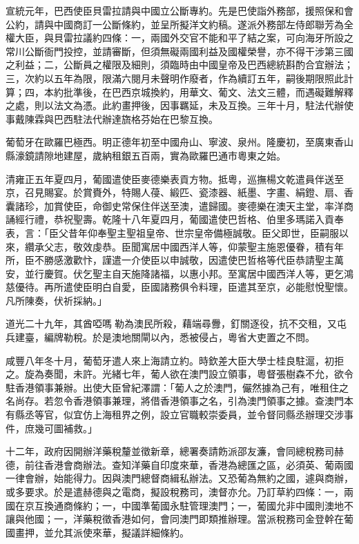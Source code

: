\begin{pinyinscope}
宣統元年，巴西使臣貝雷拉請與中國立公斷專約。先是巴使詣外務部，援照保和會公約，請與中國商訂一公斷條約，並呈所擬洋文約稿。遂派外務部左侍郎聯芳為全權大臣，與貝雷拉議約四條：一，兩國外交官不能和平了結之案，可向海牙所設之常川公斷衙門投控，並請審斷，但須無礙兩國利益及國權榮譽，亦不得干涉第三國之利益；二，公斷員之權限及細則，須臨時由中國皇帝及巴西總統斟酌合宜辦法；三，次約以五年為限，限滿六閱月未聲明作廢者，作為續訂五年，嗣後期限照此計算；四，本約批準後，在巴西京城換約，用華文、葡文、法文三體，而遇礙難解釋之處，則以法文為憑。此約畫押後，因事羈延，未及互換。三年十月，駐法代辦使事戴陳霖與巴西駐法代辦達旒格芬始在巴黎互換。

葡萄牙在歐羅巴極西。明正德年初至中國舟山、寧波、泉州。隆慶初，至廣東香山縣濠鏡請隙地建屋，歲納租銀五百兩，實為歐羅巴通市粵東之始。

清雍正五年夏四月，葡國遣使臣麥德樂表貢方物。抵粵，巡撫楊文乾遣員伴送至京，召見賜宴。於賞賚外，特賜人葠、緞匹、瓷漆器、紙墨、字畫、絹鐙、扇、香囊諸珍，加賞使臣，命御史常保住伴送至澳，遣歸國。麥德樂在澳天主堂，率洋商誦經行禮，恭祝聖壽。乾隆十八年夏四月，葡國遣使巴哲格、伯里多瑪諾入貢奉表，言：「臣父昔年仰奉聖主聖祖皇帝、世宗皇帝備極誠敬。臣父即世，臣嗣服以來，纘承父志，敬效虔恭。臣聞寓居中國西洋人等，仰蒙聖主施恩優眷，積有年所，臣不勝感激歡忭，謹遣一介使臣以申誠敬，因遣使巴哲格等代臣恭請聖主萬安，並行慶賀。伏乞聖主自天施降諸福，以惠小邦。至寓居中國西洋人等，更乞鴻慈優待。再所遣使臣明白自愛，臣國諸務俱令料理，臣遣其至京，必能慰悅聖懷。凡所陳奏，伏祈採納。」

道光二十九年，其酋啞嗎勒為澳民所殺，藉端尋釁，釘關逐役，抗不交租，又屯兵建臺，編牌勒稅。於是澳地關閘以內，悉被侵占，粵省大吏置之不問。

咸豐八年冬十月，葡萄牙遣人來上海請立約。時欽差大臣大學士桂良駐滬，初拒之。旋為奏聞，未許。光緒七年，葡人欲在澳門設立領事，粵督張樹森不允，欲令駐香港領事兼辦。出使大臣曾紀澤謂：「葡人之於澳門，儼然據為己有，唯租住之名尚存。若忽令香港領事兼理，將借香港領事之名，引為澳門領事之據。查澳門本有縣丞等官，似宜仿上海租界之例，設立官職較崇委員，並令督同縣丞辦理交涉事件，庶幾可圖補救。」

十二年，政府因開辦洋藥稅釐並徵新章，總署奏請飭派邵友濂，會同總稅務司赫德，前往香港會商辦法。查知洋藥自印度來華，香港為總匯之區，必須英、葡兩國一律會辦，始能得力。因與澳門總督商緝私辦法。又恐葡為無約之國，遽與商辦，或多要求。於是遣赫德與之電商，擬設稅務司，澳督亦允。乃訂草約四條：一，兩國在京互換通商條約；一，中國準葡國永駐管理澳門；一，葡國允非中國則澳地不讓與他國；一，洋藥稅徵香港如何，會同澳門即類推辦理。當派稅務司金登幹在葡國畫押，並允其派使來華，擬議詳細條約。


\end{pinyinscope}
